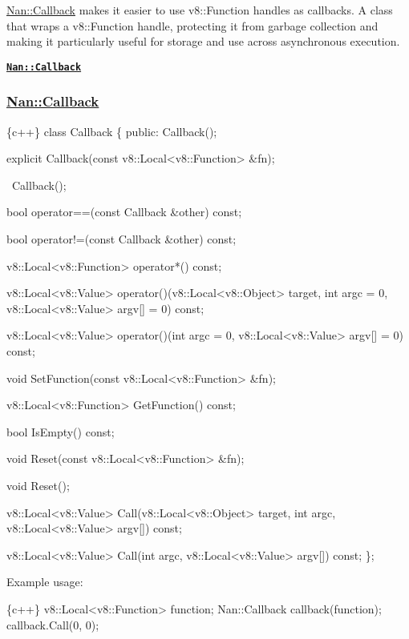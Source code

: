 {\ttfamily \hyperlink{class_nan_1_1_callback}{Nan\+::\+Callback}} makes it easier to use {\ttfamily v8\+::\+Function} handles as callbacks. A class that wraps a {\ttfamily v8\+::\+Function} handle, protecting it from garbage collection and making it particularly useful for storage and use across asynchronous execution.


\begin{DoxyItemize}
\item \href{#api_nan_callback}{\tt {\bfseries {\ttfamily Nan\+::\+Callback}}}
\end{DoxyItemize}

\label{_api_nan_callback}%
 \subsubsection*{\hyperlink{class_nan_1_1_callback}{Nan\+::\+Callback}}


\begin{DoxyCode}
\{c++\}
class Callback \{
 public:
  Callback();

  explicit Callback(const v8::Local<v8::Function> &fn);

  ~Callback();

  bool operator==(const Callback &other) const;

  bool operator!=(const Callback &other) const;

  v8::Local<v8::Function> operator*() const;

  v8::Local<v8::Value> operator()(v8::Local<v8::Object> target,
                                  int argc = 0,
                                  v8::Local<v8::Value> argv[] = 0) const;

  v8::Local<v8::Value> operator()(int argc = 0,
                                  v8::Local<v8::Value> argv[] = 0) const;

  void SetFunction(const v8::Local<v8::Function> &fn);

  v8::Local<v8::Function> GetFunction() const;

  bool IsEmpty() const;

  void Reset(const v8::Local<v8::Function> &fn);

  void Reset();

  v8::Local<v8::Value> Call(v8::Local<v8::Object> target,
                            int argc,
                            v8::Local<v8::Value> argv[]) const;

  v8::Local<v8::Value> Call(int argc, v8::Local<v8::Value> argv[]) const;
\};
\end{DoxyCode}


Example usage\+:


\begin{DoxyCode}
\{c++\}
v8::Local<v8::Function> function;
Nan::Callback callback(function);
callback.Call(0, 0);
\end{DoxyCode}
 